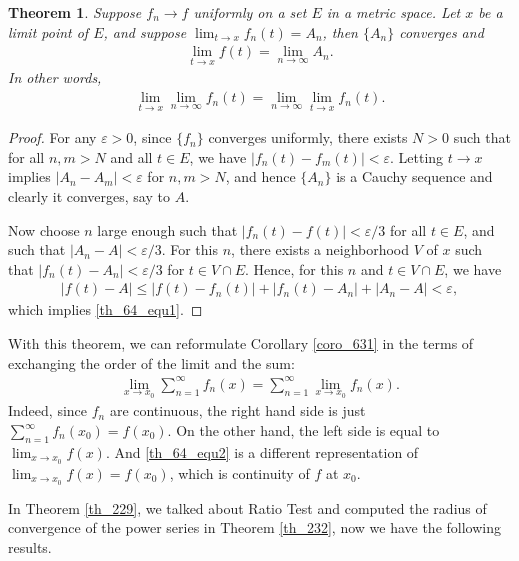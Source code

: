 \documentclass[10pt]{book}
\newtheorem{theorem}{Theorem}[chapter]
\theoremstyle{definition}
\numberwithin{equation}{chapter}
\begin{document}
\begin{theorem}\label{th_64}
Suppose $f_n \to f$ uniformly on a set $E$ in a metric space. Let $x$ be a limit point of $E$, and suppose $\lim_{t\to x} f_n(t) = A_n$, then $\{A_n\}$ converges and
\begin{align}\label{th_64_equ1}
    \lim_{t\to x} f(t) = \lim_{n\to\infty} A_n.
\end{align}
In other words,
\begin{align*}
    \lim_{t\to x} \lim_{n\to\infty} f_n(t) = \lim_{n\to\infty} \lim_{t\to x} f_n(t).
\end{align*}
\end{theorem}
\begin{proof}
For any $\varepsilon > 0$, since $\{f_n\}$ converges uniformly, there exists $N > 0$ such that for all $n,m > N$ and all $t \in E$, we have $\left|f_n(t) - f_m(t)\right| < \varepsilon$. Letting $t \to x$ implies $\left|A_n - A_m\right| < \varepsilon$ for $n,m > N$, and hence $\{A_n\}$ is a Cauchy sequence and clearly it converges, say to $A$. 

Now choose $n$ large enough such that $\left|f_n(t) - f(t)\right| < \varepsilon/3$ for all $t \in E$, and such that $\left|A_n - A\right| < \varepsilon/3$. For this $n$, there exists a neighborhood $V$ of $x$ such that $\left|f_n(t) - A_n\right| < \varepsilon/3$ for $t \in V \cap E$. Hence, for this $n$ and $t \in V \cap E$, we have
\begin{align*}
    \left|f(t) - A\right| \leq \left|f(t) - f_n(t)\right| + \left|f_n(t) - A_n\right| + \left|A_n - A\right| < \varepsilon,
\end{align*}
which implies \eqref{th_64_equ1}.
\end{proof}

\medskip

With this theorem, we can reformulate Corollary \ref{coro_631} in the terms of exchanging the order of the limit and the sum:
\begin{align}\label{th_64_equ2}
    \lim_{x\to x_0} \sum^\infty_{n=1} f_n(x) = \sum^\infty_{n=1} \lim_{x\to x_0} f_n(x).
\end{align}
Indeed, since $f_n$ are continuous, the right hand side is just $\sum^\infty_{n=1} f_n(x_0) = f(x_0)$. On the other hand,  the left side is equal to $\lim_{x \to x_0} f(x)$. And \eqref{th_64_equ2} is a different representation of $\lim_{x\to x_0} f(x) = f(x_0)$, which is continuity of $f$ at $x_0$.

\medskip

In Theorem \ref{th_229}, we talked about Ratio Test and computed the radius of convergence of the power series in Theorem \ref{th_232}, now we have the following results.
\end{document}
